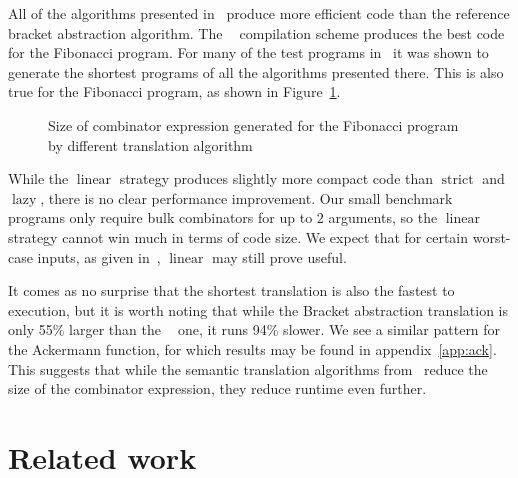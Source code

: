 \documentclass[conference]{IEEEtran}
\DeclareMathOperator{\strict}{strict}
\DeclareMathOperator{\lazy}{lazy}
\DeclareMathOperator{\lazyeta}{lazy_\eta}
\DeclareMathOperator{\linear}{linear}
\begin{document}
All of the algorithms presented in~\cite{kiselyov_lambda_2018} produce more efficient code than the reference bracket abstraction algorithm.
The $\lazyeta$ compilation scheme produces the best code for the Fibonacci program.
For many of the test programs in~\cite{kiselyov_lambda_2018} it was shown to generate the shortest programs of all the algorithms presented there.
This is also true for the Fibonacci program, as shown in Figure~\ref{fig:fib-sizes}.

\begin{figure}
    \centering
    \caption{Size of combinator expression generated for the Fibonacci program by different translation algorithm}
    \label{fig:fib-sizes}
\end{figure}

While the $\linear$ strategy produces slightly more compact code than $\strict$ and $\lazy$, there is no clear performance improvement.
Our small benchmark programs only require bulk combinators for up to $2$ arguments, so the $\linear$ strategy cannot win much in terms of code size.
We expect that for certain worst-case inputs, as given in~\cite{kiselyov_lambda_2018}, $\linear$ may still prove useful.

It comes as no surprise that the shortest translation is also the fastest to execution, but it is worth noting that while the Bracket abstraction translation is only 55\% larger than the $\lazyeta$ one, it runs 94\% slower.
We see a similar pattern for the Ackermann function, for which results may be found in appendix~\ref{app:ack}.
This suggests that while the semantic translation algorithms from~\cite{kiselyov_lambda_2018} reduce the size of the combinator expression, they reduce runtime even further.

\section{Related work}
\end{document}
